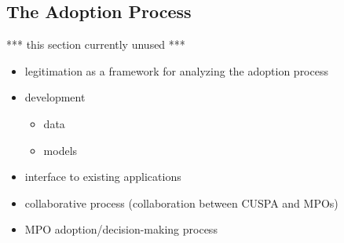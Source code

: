 
\subsection{The Adoption Process}

*** this section currently unused ***

\begin{itemize}

\item legitimation as a framework for analyzing the adoption process

\item  development
  \begin{itemize}
  \item data
  \item  models
  \end{itemize}

\item interface to existing applications

\item collaborative process (collaboration between CUSPA and MPOs)

\item MPO adoption/decision-making process

\end{itemize}



